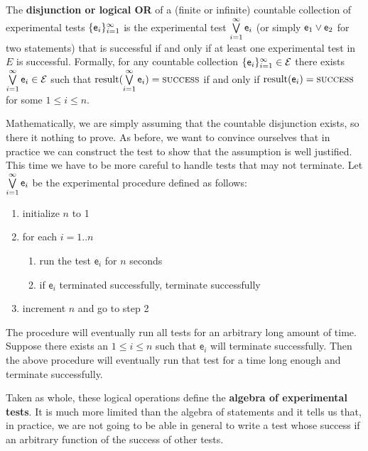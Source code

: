 \documentclass[11pt,letterpaper,fleqn]{memoir} %
\begin{document}
\begin{mathSection}
	\begin{axiom}\label{def_experimental_test_OR}
	The \textbf{disjunction or logical OR} of a (finite or infinite) countable collection of experimental tests $\{\mathsf{e}_i\}_{i=1}^{\infty}$ is the experimental test $\bigvee\limits_{i=1}^{\infty} \mathsf{e}_i$ (or simply $\mathsf{e}_1 \vee \mathsf{e}_2$ for two statements) that is successful if and only if at least one experimental test in $E$ is successful. Formally, for any countable collection $\{\mathsf{e}_i\}_{i=1}^{\infty} \in \mathcal{E}$ there exists $ \bigvee\limits_{i=1}^{\infty} \mathsf{e}_i \in \mathcal{E}$ such that $\operatorname{result}(\bigvee\limits_{i=1}^{\infty} \mathsf{e}_i) = \textsc{success}$ if and only if $\operatorname{result}(\mathsf{e}_i) = \textsc{success}$ for some $1 \leq i \leq n$.
	\end{axiom}
	\begin{justification}
		Mathematically, we are simply assuming that the countable disjunction exists, so there it nothing to prove. As before, we want to convince ourselves that in practice we can construct the test to show that the assumption is well justified. This time we have to be more careful to handle tests that may not terminate.
		Let $\bigvee\limits_{i=1}^{\infty} \mathsf{e}_i$ be the experimental procedure defined as follows:
		\begin{enumerate}
			\item initialize $n$ to 1
			\item for each $i=1..n$
			\begin{enumerate}
				\item run the test $\mathsf{e}_i$ for $n$ seconds
				\item if $\mathsf{e}_i$ terminated successfully, terminate successfully
			\end{enumerate}
			\item increment $n$ and go to step 2
		\end{enumerate}
		The procedure will eventually run all tests for an arbitrary long amount of time. Suppose there exists an $1 \leq i \leq n$ such that $\mathsf{e}_i$ will terminate successfully. Then the above procedure will eventually run that test for a time long enough and terminate successfully.
	\end{justification}
\end{mathSection}

Taken as whole, these logical operations define the \textbf{algebra of experimental tests}. It is much more limited than the algebra of statements and it tells us that, in practice, we are not going to be able in general to write a test whose success if an arbitrary function of the success of other tests.
\end{document}
